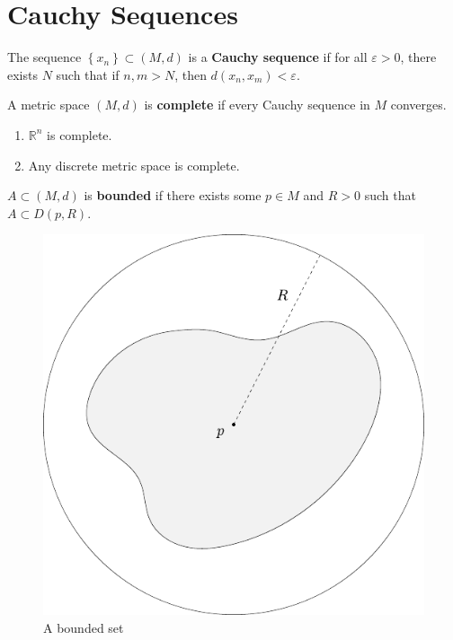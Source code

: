 \documentclass[10pt]{report}
\begin{document}
\section{Cauchy Sequences}

\begin{defn}[]
	The sequence $\left\{ x_n \right\}\subset (M,d)$ is a \textbf{Cauchy sequence} if for all $\varepsilon>0$, there exists $N$ such that if $n,m>N$, then $d(x_n,x_m) < \varepsilon$.
\end{defn}

\begin{defn}[]
	A metric space $(M,d)$ is \textbf{complete} if every Cauchy sequence in $M$ converges.
\end{defn}

\begin{ex}[]
	\begin{enumerate}
		\item $\mathbb{R}^n$ is complete.
		\item Any discrete metric space is complete.
	\end{enumerate}
\end{ex}

\begin{defn}[]
	$A \subset (M,d)$ is \textbf{bounded} if there exists some $p \in M$ and $R>0$ such that $A \subset D(p,R)$.
\end{defn}

\begin{figure}[H]
	\centering
	\includegraphics[scale=0.6]{fig/bounded.pdf}
	\caption{A bounded set}
\end{figure}
\end{document}
